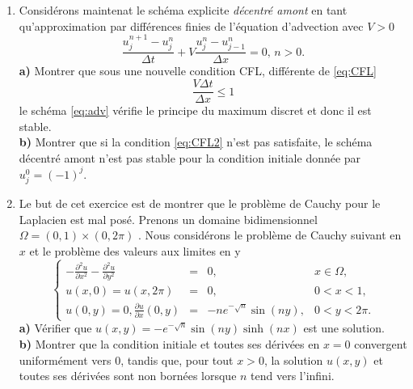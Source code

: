\documentclass[12pt,a4paper]{article}
\begin{document}
\begin{enumerate}
Il s'agit ici d'un probl\`eme aux limites o\`u on a impos\'e des conditions de
Dirichlet. \\
{\bf a)} Si on note par $U^n = (u_j^n)_{1\le j\le J}$ le vecteur des valeurs
inconnues \`a l'instant $n$, v\'erifier qu'on peut calculer de mani\`ere unique $U^n$
en fonction de $U^{n-1}$, en r\'esolvant un syst\`eme lin\'eaire de
la forme
$$
AU^n=U^{n-1}
$$
dont on pr\'ecisera la matrice. (Il faudra ensuite montrer que la
matrice est inversible ce qui entra\^inera l'unicit\'e).\\
{\bf b)} Montrer que pour tous les temps $t_n \ge 0$ le principe du
maximum discret \eqref{eq:max} est v\'erifi\'e sans aucune condition
sur le pas de temps $\Delta t$ et le pas d'espace $\Delta x$. On dit que le
sch\'ema est {\it inconditionnellement stable}. 
\item Consid\'erons maintenat le sch\'ema explicite {\it d\'ecentr\'e
    amont} en tant qu'approximation par diff\'erences finies de
  l'\'equation d'advection avec $V>0$
\begin{equation}\label{eq:adv}
\displaystyle\frac{u_j^{n+1}-u_j^{n}}{\Delta
  t}+V\frac{u_j^n-u_{j-1}^n}{\Delta x} = 0,\, n >0.
\end{equation}
{\bf a)} Montrer que sous une nouvelle condition CFL, diff\'erente de
\eqref{eq:CFL}
\begin{equation}\label{eq:CFL2}
\frac{V\Delta t}{\Delta x} \le 1
\end{equation}
le sch\'ema \eqref{eq:adv} v\'erifie le principe du maximum discret et
donc il est stable.\\
{\bf b)} Montrer que si la condition \eqref{eq:CFL2} n'est pas
satisfaite, le sch\'ema d\'ecentr\'e amont n'est pas stable pour la
condition initiale donn\'ee par $u^0_j=(-1)^j$.
\item Le but de cet exercice est de montrer que le problème de Cauchy pour le Laplacien est mal posé. Prenons un domaine bidimensionnel $\Omega = (0,1)\times (0,2\pi)$ . Nous considérons le problème de Cauchy suivant en $x$ et le problème des valeurs aux limites en y
$$
\left\{\begin{array}{rcll}
-\displaystyle\frac{\partial^2u}{\partial x^2}  -\frac{\partial^2u}{\partial y^2} & = & 0, & x\in \Omega, \\[2ex]
u(x,0) = u(x,2\pi) &=& 0, & 0< x<1,\\[2ex]
\displaystyle u(0,y) = 0, \frac{\partial u}{\partial x}(0,y) &=&  -ne^{-\sqrt{n}}\sin (ny), & 0<y<2\pi.
\end{array}\right.
$$
{\bf a)} Vérifier que $u (x, y) = -e^{-\sqrt{n}}\sin (ny) \sinh (nx)$ est une solution. \\
{\bf b)} Montrer que la condition initiale et toutes ses dérivées en $x=0$ convergent uniformément vers 0, tandis que, pour tout $x>0$, la solution $u(x,y)$ et toutes ses dérivées sont non bornées lorsque $n$ tend vers l'infini.
\end{enumerate}
\end{document}

